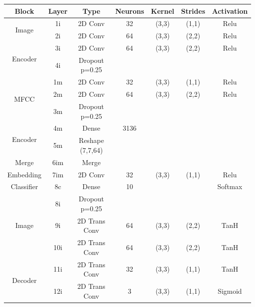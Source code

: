  
	\begin{table}[h!]
		\centering
		\begin{tabular}{|c|c|c|c|c|c|c|}
			\hline
			\textbf{Block} & \textbf{Layer} & \textbf{Type} & \textbf{Neurons} & \textbf{Kernel} & \textbf{Strides} & \textbf{Activation}  \\ \hline
			\multirow{2}{*}{Image} & 1i	&	2D Conv & 32 & (3,3) & (1,1) & Relu \\ \cline{2-7}
			& 2i	&	2D Conv & 64 & (3,3) & (2,2) & Relu \\ \cline{2-7}
			\multirow{2}{*}{Encoder}& 3i	&	2D Conv & 64 & (3,3) & (2,2) & Relu \\ \cline{2-7}
			& 4i	&	Dropout p=0.25 &	 & 	     &       &  \\ \hline

			\multirow{3}{*}{MFCC} & 1m	&	2D Conv & 32 & (3,3) & (1,1) & Relu \\ \cline{2-7}
			& 2m	&	2D Conv & 64 & (3,3) & (2,2) & Relu \\ \cline{2-7}
			& 3m 	&	Dropout p=0.25 &	 & 	     &       & \\ \cline{2-7}
			\multirow{2}{*}{Encoder} & 4m	&	Dense          & 3136 & 	 &       & \\ \cline{2-7}
			& 5m  &	Reshape (7,7,64) & & & & \\ \hline

			Merge & 6im	& Merge & & & & \\ \hline
			Embedding& 7im	&	2D Conv & 32 & (3,3) & (1,1) & Relu \\ \hline
			Classifier & 8c	&	Dense          & 10 &       &       & Softmax \\ \hline

			\multirow{3}{*}{Image} & 8i 	&	Dropout p=0.25 &	 & 	     &       & \\ \cline{2-7}
			& 9i	&	2D Trans Conv & 64 & (3,3) & (2,2)  & TanH \\ \cline{2-7}
			& 10i	&	2D Trans Conv & 64 & (3,3) & (2,2)  & TanH \\ \cline{2-7}
			\multirow{2}{*}{Decoder}& 11i	&	2D Trans Conv & 32 & (3,3) & (1,1)  & TanH \\ \cline{2-7}
			& 12i	&	2D Trans Conv & 3 & (3,3) & (1,1) & Sigmoid\\ \hline 


\end{tabular}
\end{table}
